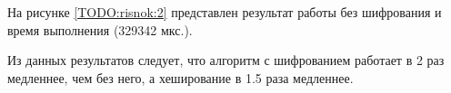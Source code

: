 На рисунке \ref{TODO:risnok:2} представлен результат работы без шифрования и время выполнения (329342 мкс.).


\begin{figure}[ht!]
\end{figure}


Из данных результатов следует, что алгоритм с шифрованием работает в 2 раз медленнее, чем без него, а хеширование в 1.5 раза медленнее.

